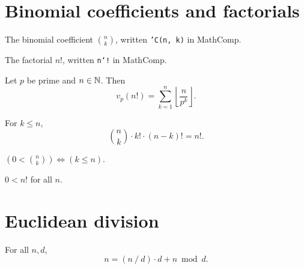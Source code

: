 \section{Binomial coefficients and factorials}

\begin{definition}
  \label{def:binomial}
  \rocqok
  The binomial coefficient $\binom{n}{k}$, written \texttt{'C(n, k)}
  in MathComp.
\end{definition}

\begin{definition}[Factorial]
  \label{def:factorial}
  \rocqok
  The factorial $n!$, written \texttt{n`!} in MathComp.
\end{definition}

\begin{lemma}
  \label{lem:logn_fact}
  \rocqok
  Let $p$ be prime and $n \in \mathbb{N}$. Then
  \[
    v_p(n!) = \sum_{k=1}^{n} \left\lfloor \frac{n}{p^k} \right\rfloor.
  \]
\end{lemma}

\begin{lemma}
  \label{lem:bin_fact}
  \rocqok
  For $k \leq n$,
  \[
    \binom{n}{k} \cdot k! \cdot (n-k)! = n!.
  \]
\end{lemma}

\begin{lemma}
  \label{lem:bin_gt0}
  \rocqok
  $(0 < \binom{n}{k}) \iff (k \leq n)$.
\end{lemma}

\begin{lemma}
  \label{lem:fact_gt0}
  \rocqok
  $0 < n!$ for all $n$.
\end{lemma}

\section{Euclidean division}

\begin{lemma}
  \label{lem:divn_eq}
  \rocqok
  For all $n, d$,
  \[
    n = (n \mathbin{/} d) \cdot d + n \bmod d.
  \]
\end{lemma}

